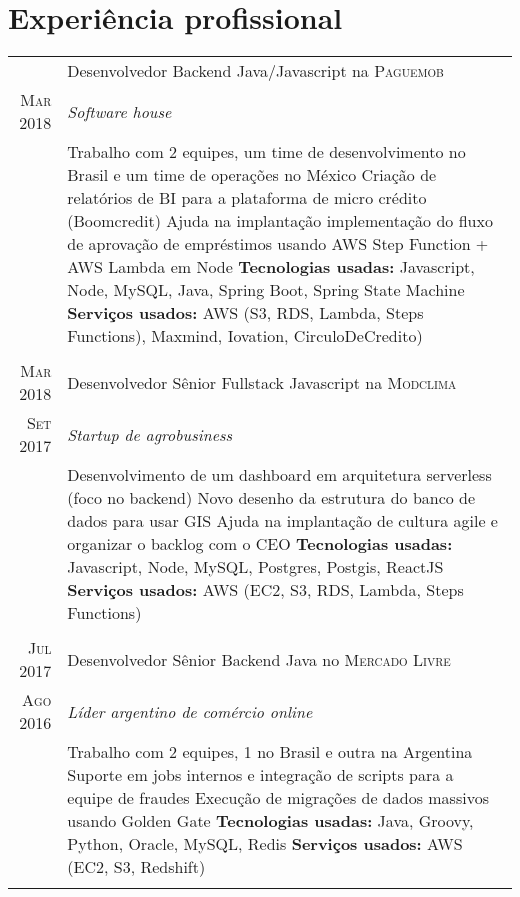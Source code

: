 \documentclass[a4paper,10pt]{article}
\begin{document}
\section{Experiência profissional}
\begin{tabular}{r|p{11cm}}

 \textsc{ } & Desenvolvedor Backend Java/Javascript na \textsc{Paguemob} \\\textsc{Mar 2018}&\emph{Software house }\\&\footnotesize{
  Trabalho com 2 equipes, um time de desenvolvimento no Brasil e um time de operações no México\newline
  Criação de relatórios de BI para a plataforma de micro crédito (Boomcredit)\newline
  Ajuda na implantação implementação do fluxo de aprovação de empréstimos usando AWS Step Function + AWS Lambda em Node\newline
\textbf{Tecnologias usadas:} Javascript, Node, MySQL, Java, Spring Boot, Spring State Machine\newline
\textbf{Serviços usados:} AWS (S3, RDS, Lambda, Steps Functions), Maxmind, Iovation, CirculoDeCredito)}\\\multicolumn{2}{c}{} \\

 \textsc{Mar 2018}  & Desenvolvedor Sênior Fullstack Javascript na \textsc{Modclima} \\\textsc{Set 2017}&\emph{Startup de agrobusiness }\\&\footnotesize{
  Desenvolvimento de um dashboard em arquitetura serverless (foco no backend)\newline
  Novo desenho da estrutura do banco de dados para usar GIS\newline
  Ajuda na implantação de cultura agile e organizar o backlog com o CEO\newline
\textbf{Tecnologias usadas:} Javascript, Node, MySQL, Postgres, Postgis, ReactJS\newline
\textbf{Serviços usados:} AWS (EC2, S3, RDS, Lambda, Steps Functions)}\\\multicolumn{2}{c}{} \\

 \textsc{Jul 2017} & Desenvolvedor Sênior Backend Java no \textsc{Mercado Livre} \\\textsc{Ago 2016}&\emph{Líder argentino de comércio online }\\&\footnotesize{
  Trabalho com 2 equipes, 1 no Brasil e outra na Argentina\newline
  Suporte em jobs internos e integração de scripts para a equipe de fraudes\newline
  Execução de migrações de dados massivos usando Golden Gate\newline
\textbf{Tecnologias usadas:} Java, Groovy, Python, Oracle, MySQL, Redis\newline
\textbf{Serviços usados:} AWS (EC2, S3, Redshift)}\\\multicolumn{2}{c}{} \\


\end{tabular}
\end{document}
